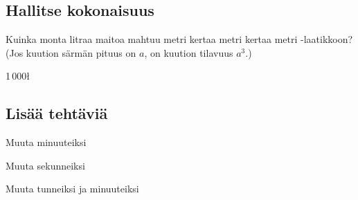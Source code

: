 \begin{tehtavasivu}
\subsection*{Hallitse kokonaisuus}

\begin{tehtava}
Kuinka monta litraa maitoa mahtuu metri kertaa metri kertaa metri -laatikkoon? (Jos kuution särmän pituus on $a$, on kuution tilavuus $a^3$.)
	\begin{vastaus}
	1\,000\l
	\end{vastaus}
\end{tehtava}

\subsection*{Lisää tehtäviä}


\begin{tehtava}
Muuta minuuteiksi
\begin{alakohdat}
\end{alakohdat}
\begin{vastaus}
\begin{alakohdat}
\end{alakohdat}
\end{vastaus}
\end{tehtava}
\begin{tehtava}
Muuta sekunneiksi
\begin{alakohdat}
\end{alakohdat}
\begin{vastaus}
\begin{alakohdat}
\end{alakohdat}
\end{vastaus}
\end{tehtava}

\begin{tehtava}
Muuta tunneiksi ja minuuteiksi
\begin{alakohdat}
\end{alakohdat}
\begin{vastaus}
\begin{alakohdat}
\end{alakohdat}
\end{vastaus}
\end{tehtava}


\end{tehtavasivu}
